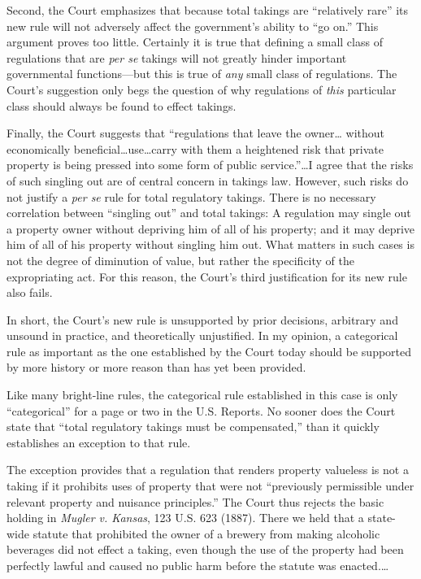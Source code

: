 Second, the Court emphasizes that because total takings are ``relatively rare''
its new rule will not adversely affect the government's ability to ``go on.''
This argument proves too little. Certainly it is true that defining a small
class of regulations that are \textit{per se} takings will not greatly hinder
important governmental functions---but this is true of \textit{any} small class
of regulations. The Court's suggestion only begs the question of why regulations
of \textit{this} particular class should always be found to effect takings.

Finally, the Court suggests that ``regulations that leave the owner\ldots
without economically beneficial\ldots use\ldots carry with them a heightened
risk that private property is being pressed into some form of public
service.''\ldots I agree that the risks of such singling out are of central
concern in takings law. However, such risks do not justify a \textit{per se}
rule for total regulatory takings. There is no necessary correlation between
``singling out'' and total takings: A regulation may single out a property owner
without depriving him of all of his property; and it may deprive him of all of
his property without singling him out. What matters in such cases is not the
degree of diminution of value, but rather the specificity of the expropriating
act. For this reason, the Court's third justification for its new rule also
fails.

In short, the Court's new rule is unsupported by prior decisions, arbitrary and
unsound in practice, and theoretically unjustified. In my opinion, a categorical
rule as important as the one established by the Court today should be supported
by more history or more reason than has yet been provided.


Like many bright-line rules, the categorical rule established in this case is
only ``categorical'' for a page or two in the U.S. Reports. No sooner does the
Court state that ``total regulatory takings must be compensated,'' than it
quickly establishes an exception to that rule.

The exception provides that a regulation that renders property valueless is not
a taking if it prohibits uses of property that were not ``previously permissible
under relevant property and nuisance principles.'' The Court thus rejects the
basic holding in \textit{Mugler v. Kansas}, 123 U.S. 623 (1887). There we held
that a state-wide statute that prohibited the owner of a brewery from making
alcoholic beverages did not effect a taking, even though the use of the property
had been perfectly lawful and caused no public harm before the statute was
enacted.\ldots

